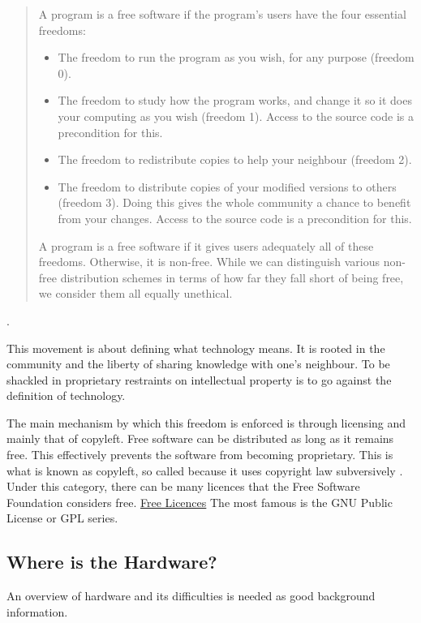 \documentclass[acmtog]{acmart}
\begin{document}
\begin{quote}
    A program is a free software if the program’s users have the four essential freedoms:

    \begin{itemize}
        \item The freedom to run the program as you wish, for any purpose (freedom 0).
        \item The freedom to study how the program works, and change it so it does your computing as you wish (freedom 1). 
            Access to the source code is a precondition for this.
        \item The freedom to redistribute copies to help your neighbour (freedom 2).
        \item The freedom to distribute copies of your modified versions to others (freedom 3). 
            Doing this gives the whole community a chance to benefit from your changes. Access to the source code is a precondition for this.
    \end{itemize}
    A program is a free software if it gives users adequately all of these freedoms. Otherwise, it is non-free. 
    While we can distinguish various non-free distribution schemes in terms of how far they fall short of being free, we consider them all equally unethical.
\end{quote} \cite{b0_stallman}.

This movement is about defining what technology means. 
It is rooted in the community and the liberty of sharing knowledge with one's neighbour. 
To be shackled in proprietary restraints on intellectual property is to go against the definition of technology.

The main mechanism by which this freedom is enforced is through licensing and mainly that of copyleft. 
Free software can be distributed as long as it remains free. 
This effectively prevents the software from becoming proprietary. 
This is what is known as copyleft, so called because it uses copyright law subversively \cite{b0_stallman}.
Under this category, there can be many licences that the Free Software Foundation considers free.
\href{https://www.gnu.org/licenses/license-list.html}{Free Licences}
The most famous is the GNU Public License or GPL series.

\subsection{Where is the Hardware?}
An overview of hardware and its difficulties is needed as good background information. 
\end{document}
